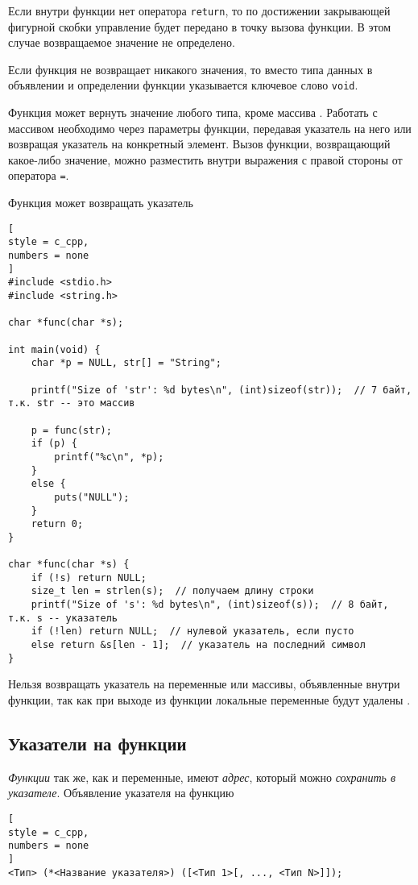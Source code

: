 \documentclass[%
	11pt,
	a4paper,
	utf8,
		]{article}
\begin{document}
Если внутри функции нет оператора \verb|return|, то по достижении закрывающей фигурной скобки управление будет передано в точку вызова функции. В этом случае возвращаемое значение не определено.

Если функция не возвращает никакого значения, то вместо типа данных в объявлении и определении функции указывается ключевое слово \verb|void|.

Функция может вернуть значение любого типа, кроме массива \cite[]{prokhorenok-prog-c:2020}. Работать с массивом необходимо через параметры функции, передавая указатель на него или возвращая указатель на конкретный элемент. Вызов функции, возвращающий какое-либо значение, можно разместить внутри выражения с правой стороны от оператора \verb|=|.

Функция может возвращать указатель
\begin{lstlisting}[
style = c_cpp,
numbers = none
]
#include <stdio.h>
#include <string.h>

char *func(char *s);

int main(void) {
    char *p = NULL, str[] = "String";
    
    printf("Size of 'str': %d bytes\n", (int)sizeof(str));  // 7 байт, т.к. str -- это массив
    
    p = func(str);
    if (p) {
        printf("%c\n", *p);
    }
    else {
        puts("NULL");
    }
    return 0;
}

char *func(char *s) {
    if (!s) return NULL;
    size_t len = strlen(s);  // получаем длину строки
    printf("Size of 's': %d bytes\n", (int)sizeof(s));  // 8 байт, т.к. s -- указатель
    if (!len) return NULL;  // нулевой указатель, если пусто
    else return &s[len - 1];  // указатель на последний символ
}
\end{lstlisting}

Нельзя возвращать указатель на переменные или массивы, объявленные внутри функции, так как при выходе из функции локальные переменные будут удалены \cite[]{prokhorenok-prog-c:2020}.

\subsection{Указатели на функции}

\emph{Функции} так же, как и переменные, имеют \emph{адрес}, который можно \emph{сохранить в указателе}. Объявление указателя на функцию
\begin{lstlisting}[
style = c_cpp,
numbers = none
]
<Тип> (*<Название указателя>) ([<Тип 1>[, ..., <Тип N>]]);
\end{lstlisting}
\end{document}
